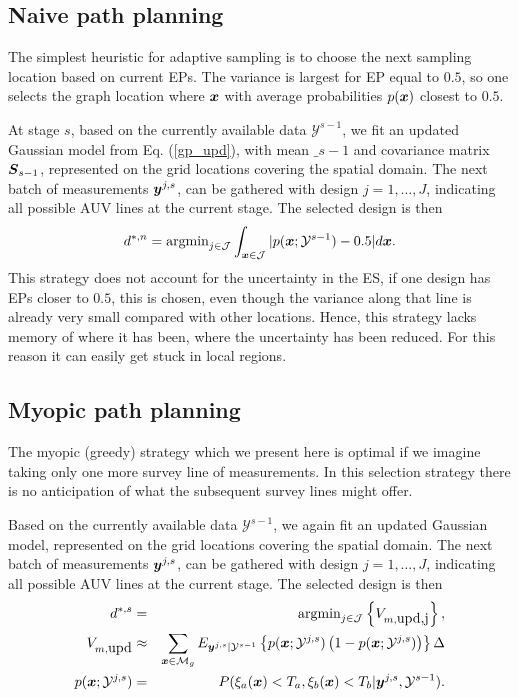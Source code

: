 \documentclass[aoas]{imsart}
\begin{document}
\subsection{Naive path planning}
\label{naive}

The simplest heuristic for adaptive sampling is to choose the next sampling location based on current EPs. The variance is largest for EP equal to $0.5$, so one selects the graph location where ${\boldsymbol x}$ with average probabilities $p({\boldsymbol x})$ closest to $0.5$. 

At stage $s$, based on the currently available data $\mathcal{Y}^{s-1}$, we fit an updated Gaussian model from Eq. (\ref{gp_upd}), with mean $\bm_{s-1}$ and covariance matrix ${\boldsymbol S}_{s-1}$, represented on the grid locations covering the spatial domain. 
The next batch of measurements ${\boldsymbol y}^{j,s}$, can be  gathered with design $j=1,\ldots,J$, indicating all possible AUV lines at the current stage. The selected design is then
\begin{equation}\label{critNaive}
    d^{*,n} = \mbox{argmin}_{j \in \mathcal{J}} \int_{\bx \in \mathcal{J}} |p(\bx;\mathcal{Y}^{s-1})-0.5| d\bx. 
\end{equation}
This strategy does not account for the uncertainty in the ES, if one design has EPs closer to $0.5$, this is chosen, even though the variance along that line is already very small compared with other locations. Hence, this strategy lacks memory of where it has been, where the uncertainty has been reduced. For this reason it can easily get stuck in local regions. 

\subsection{Myopic path planning}
\label{myopic}

The myopic (greedy) strategy which we present here is optimal if we imagine taking only one more survey line of measurements. In this selection strategy there is no anticipation of what the subsequent survey lines might offer. 

Based on the currently available data $\mathcal{Y}^{s-1}$, we again fit an updated Gaussian model, represented on the grid locations covering the spatial domain. 
The next batch of measurements ${\boldsymbol y}^{j,s}$, can be  gathered with design $j=1,\ldots,J$, indicating all possible AUV lines at the current stage. The selected design is then
\begin{eqnarray}\label{critSEQ}
    d^{*,s} &=& \mbox{argmin}_{j \in \mathcal{J}} \left\{ V_{m,\mbox{upd,j}} \right\},  \\
V_{m,\mbox{upd}} & \approx & \sum_{\bx \in \mathcal{M}_g} E_{\by^{j,s}|\mathcal{Y}^{s-1}} \left\{ p(\bx;\mathcal{Y}^{j,s})\left( 1-p(\bx;\mathcal{Y}^{j,s})\right) \right\} \Delta \nonumber \\
    p(\bx;\mathcal{Y}^{j,s}) &=& P(\xi_a(\bx) < T_a, \xi_b(\bx) < T_b |\by^{j,s},\mathcal{Y}^{s-1}). \nonumber
\end{eqnarray}
\end{document}
